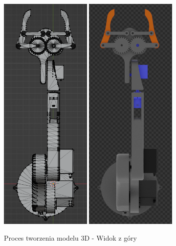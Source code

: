 \documentclass[11pt,titlepage,a4paper]{article}
\begin{document}
\begin{figure}[h!]
    \vspace{3cm}
    \begin{center}
        \includegraphics[width=0.4\textwidth]{img/topW.png}
        \includegraphics[width=0.4\textwidth]{img/topC.png}
    \end{center}
    \vspace{2cm}
    \caption{Proces tworzenia modelu 3D - Widok z góry}
    \label{Modelowanie3Dtop}
\end{figure}
\end{document}

